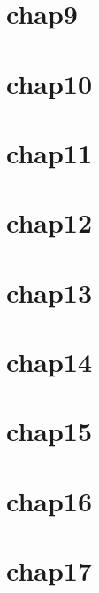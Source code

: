 \documentclass[en,11pt,english,black,simple,device=ppt]{elegantbook}
\begin{document}
\section{chap9}



\section{chap10}



\section{chap11}



\section{chap12}



\section{chap13}



\section{chap14}



\section{chap15}



\section{chap16}



\section{chap17}
\end{document}
